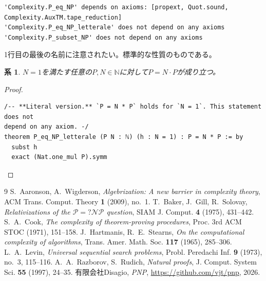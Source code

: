 \documentclass[11pt,a4paper]{amsart}
\newtheorem{corollario}[teorema]{系}
\theoremstyle{remark}
\begin{document}
\begin{listato}[\scriptsize]
\begin{verbatim}
'Complexity.P_eq_NP' depends on axioms: [propext, Quot.sound, Complexity.AuxTM.tape_reduction]
'Complexity.P_eq_NP_letterale' does not depend on any axioms
'Complexity.P_subset_NP' does not depend on any axioms
\end{verbatim}
\end{listato}

\noindent 1行目の最後の名前に注意されたい。標準的な性質のものである。

\begin{corollario}\label{cor:lett}
$N = 1$を満たす任意の$P, N \in \mathbb{N}$に対して$P = N \cdot P$が成り立つ。
\end{corollario}

\begin{proof}
\begin{listato}
\begin{verbatim}
/-- **Literal version.** `P = N * P` holds for `N = 1`. This statement does not
depend on any axiom. -/
theorem P_eq_NP_letterale (P N : ℕ) (h : N = 1) : P = N * P := by
  subst h
  exact (Nat.one_mul P).symm
\end{verbatim}
\end{listato}
\end{proof}

\begin{thebibliography}{9}
 S.~Aaronson, A.~Wigderson,
  \emph{Algebrization: A new barrier in complexity theory},
  ACM Trans. Comput. Theory \textbf{1} (2009), no.~1.
 T.~Baker, J.~Gill, R.~Solovay,
  \emph{Relativizations of the $\mathcal{P} =? \mathcal{NP}$ question},
  SIAM J. Comput. \textbf{4} (1975), 431--442.
 S.~A.~Cook,
  \emph{The complexity of theorem-proving procedures},
  Proc. 3rd ACM STOC (1971), 151--158.
 J.~Hartmanis, R.~E.~Stearns,
  \emph{On the computational complexity of algorithms},
  Trans. Amer. Math. Soc. \textbf{117} (1965), 285--306.
 L.~A.~Levin,
  \emph{Universal sequential search problems},
  Probl. Peredachi Inf. \textbf{9} (1973), no.~3, 115--116.
 A.~A.~Razborov, S.~Rudich,
  \emph{Natural proofs},
  J. Comput. System Sci. \textbf{55} (1997), 24--35.
 有限会社Disagio,
  \emph{PNP}, \url{https://github.com/vjt/pnp}, 2026.
\end{thebibliography}
\end{document}
